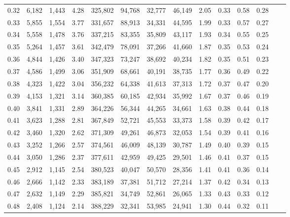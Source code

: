 \begin{tabular}{rrrrrrrrrrrrrr}
0.32 &   6,182 &  1,443 &    4.28 &  325,802 &   94,768 &  32,777 &  46,149 &  2.05 &  0.33 &  0.58 &      0.28 \\
0.33 &   5,855 &  1,554 &    3.77 &  331,657 &   88,913 &  34,331 &  44,595 &  1.99 &  0.33 &  0.57 &      0.27 \\
0.34 &   5,558 &  1,478 &    3.76 &  337,215 &   83,355 &  35,809 &  43,117 &  1.93 &  0.34 &  0.55 &      0.25 \\
0.35 &   5,264 &  1,457 &    3.61 &  342,479 &   78,091 &  37,266 &  41,660 &  1.87 &  0.35 &  0.53 &      0.24 \\
0.36 &   4,844 &  1,426 &    3.40 &  347,323 &   73,247 &  38,692 &  40,234 &  1.82 &  0.35 &  0.51 &      0.23 \\
0.37 &   4,586 &  1,499 &    3.06 &  351,909 &   68,661 &  40,191 &  38,735 &  1.77 &  0.36 &  0.49 &      0.22 \\
0.38 &   4,323 &  1,422 &    3.04 &  356,232 &   64,338 &  41,613 &  37,313 &  1.72 &  0.37 &  0.47 &      0.20 \\
0.39 &   4,153 &  1,321 &    3.14 &  360,385 &   60,185 &  42,934 &  35,992 &  1.67 &  0.37 &  0.46 &      0.19 \\
0.40 &   3,841 &  1,331 &    2.89 &  364,226 &   56,344 &  44,265 &  34,661 &  1.63 &  0.38 &  0.44 &      0.18 \\
0.41 &   3,623 &  1,288 &    2.81 &  367,849 &   52,721 &  45,553 &  33,373 &  1.58 &  0.39 &  0.42 &      0.17 \\
0.42 &   3,460 &  1,320 &    2.62 &  371,309 &   49,261 &  46,873 &  32,053 &  1.54 &  0.39 &  0.41 &      0.16 \\
0.43 &   3,252 &  1,266 &    2.57 &  374,561 &   46,009 &  48,139 &  30,787 &  1.49 &  0.40 &  0.39 &      0.15 \\
0.44 &   3,050 &  1,286 &    2.37 &  377,611 &   42,959 &  49,425 &  29,501 &  1.46 &  0.41 &  0.37 &      0.15 \\
0.45 &   2,912 &  1,145 &    2.54 &  380,523 &   40,047 &  50,570 &  28,356 &  1.41 &  0.41 &  0.36 &      0.14 \\
0.46 &   2,666 &  1,142 &    2.33 &  383,189 &   37,381 &  51,712 &  27,214 &  1.37 &  0.42 &  0.34 &      0.13 \\
0.47 &   2,632 &  1,149 &    2.29 &  385,821 &   34,749 &  52,861 &  26,065 &  1.33 &  0.43 &  0.33 &      0.12 \\
0.48 &   2,408 &  1,124 &    2.14 &  388,229 &   32,341 &  53,985 &  24,941 &  1.30 &  0.44 &  0.32 &      0.11 \\

\end{tabular}
